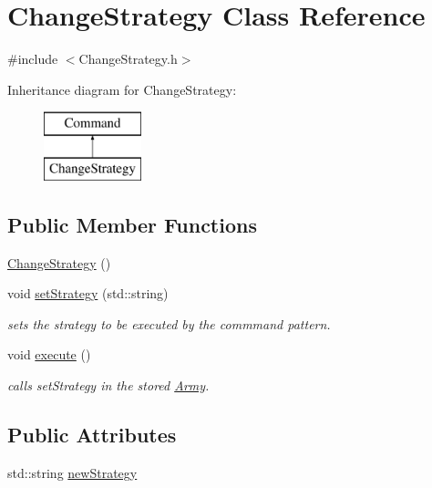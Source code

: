 \hypertarget{class_change_strategy}{}\section{Change\+Strategy Class Reference}
\label{class_change_strategy}


{\ttfamily \#include $<$Change\+Strategy.\+h$>$}

Inheritance diagram for Change\+Strategy\+:\begin{figure}[H]
\begin{center}
\leavevmode
\includegraphics[height=2.000000cm]{class_change_strategy}
\end{center}
\end{figure}
\subsection*{Public Member Functions}
\begin{DoxyCompactItemize}
\item 
\mbox{\hyperlink{class_change_strategy_a4a3aa694854f3de1ed0f63835ac1c4ab}{Change\+Strategy}} ()
\item 
void \mbox{\hyperlink{class_change_strategy_a89736c13057de424436812378b921481}{set\+Strategy}} (std\+::string)
\begin{DoxyCompactList}\small\item\em sets the strategy to be executed by the commmand pattern. \end{DoxyCompactList}\item 
void \mbox{\hyperlink{class_change_strategy_a3d93f81a8f2a98a978120eaaff18aecd}{execute}} ()
\begin{DoxyCompactList}\small\item\em calls set\+Strategy in the stored \mbox{\hyperlink{class_army}{Army}}. \end{DoxyCompactList}\end{DoxyCompactItemize}
\subsection*{Public Attributes}
\begin{DoxyCompactItemize}
\item 
std\+::string \mbox{\hyperlink{class_change_strategy_a993c743ed246e161e16bced03c5fafad}{new\+Strategy}}
\end{DoxyCompactItemize}
